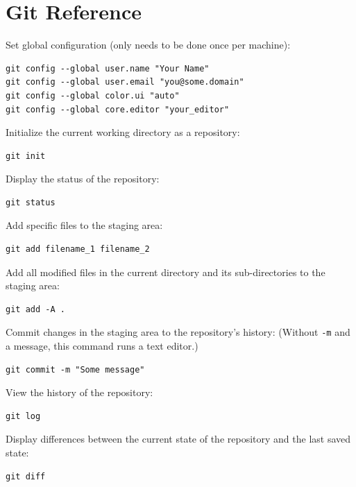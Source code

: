 \documentclass{book}
\begin{document}
\section{Git Reference}

Set global configuration (only needs to be done once per machine):

\begin{verbatim}
git config --global user.name "Your Name"
git config --global user.email "you@some.domain"
git config --global color.ui "auto"
git config --global core.editor "your_editor"
\end{verbatim}

Initialize the current working directory as a repository:

\begin{verbatim}
git init
\end{verbatim}

Display the status of the repository:

\begin{verbatim}
git status
\end{verbatim}

Add specific files to the staging area:

\begin{verbatim}
git add filename_1 filename_2
\end{verbatim}

Add all modified files in the current directory and its sub-directories
to the staging area:

\begin{verbatim}
git add -A .
\end{verbatim}

Commit changes in the staging area to the repository's history: (Without
\texttt{-m} and a message, this command runs a text editor.)

\begin{verbatim}
git commit -m "Some message"
\end{verbatim}

View the history of the repository:

\begin{verbatim}
git log
\end{verbatim}

Display differences between the current state of the repository and the
last saved state:

\begin{verbatim}
git diff
\end{verbatim}
\end{document}

